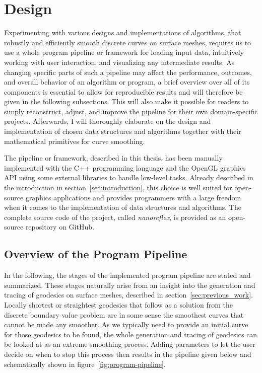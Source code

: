 \documentclass{stdlocal}
\begin{document}
\section{Design} %
\label{sec:design}

Experimenting with various designs and implementations of algorithms, that robustly and efficiently smooth discrete curves on surface meshes, requires us to use a whole program pipeline or framework for loading input data, intuitively working with user interaction, and visualizing any intermediate results.
As changing specific parts of such a pipeline may affect the performance, outcomes, and overall behavior of an algorithm or program, a brief overview over all of its components is essential to allow for reproducible results and will therefore be given in the following subsections.
This will also make it possible for readers to simply reconstruct, adjust, and improve the pipeline for their own domain-specific projects.
Afterwards, I will thoroughly elaborate on the design and implementation of chosen data structures and algorithms together with their mathematical primitives for curve smoothing.

The pipeline or framework, described in this thesis, has been manually implemented with the C++ programming language and the OpenGL graphics API using some external libraries to handle low-level tasks.
Already described in the introduction in section~\ref{sec:introduction}, this choice is well suited for open-source graphics applications and provides programmers with a large freedom when it comes to the implementation of data structures and algorithms.
The complete source code of the project, called \textit{nanoreflex}, is provided as an open-source repository on GitHub.

\subsection{Overview of the Program Pipeline} %
\label{sub:program_pipeline}
  In the following, the stages of the implemented program pipeline are stated and summarized.
  These stages naturally arise from an insight into the generation and tracing of geodesics on surface meshes, described in section~\ref{sec:previous_work}.
  Locally shortest or straightest geodesics that follow as a solution from the discrete boundary value problem are in some sense the smoothest curves that cannot be made any smoother.
  As we typically need to provide an initial curve for those geodesics to be found, the whole generation and tracing of geodesics can be looked at as an extreme smoothing process.
  Adding parameters to let the user decide on when to stop this process then results in the pipeline given below and schematically shown in figure~\ref{fig:program-pipeline}.
\end{document}
